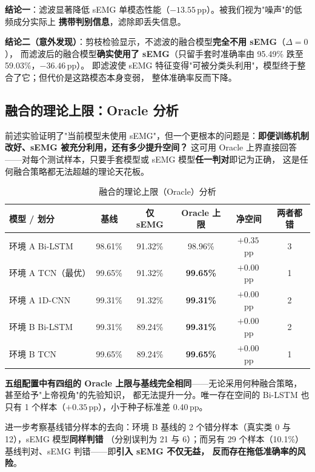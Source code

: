 \documentclass[11pt,a4paper]{ctexart}
\begin{document}
\textbf{结论一}：滤波显著降低 sEMG 单模态性能（$-13.55$\,pp）。被我们视为"噪声"的低频成分实际上
\textbf{携带判别信息}，滤除即丢失信息。

\textbf{结论二（意外发现）}：剪枝检验显示，不滤波的融合模型\textbf{完全不用 sEMG}（$\Delta=0$），
而滤波后的融合模型\textbf{确实使用了 sEMG}（只留手套时准确率由 95.49\% 跌至 59.03\%，$-36.46$\,pp）。
即滤波使 sEMG 特征变得"可被分类头利用"，模型终于整合了它；但代价是这路模态本身变弱，
整体准确率反而下降。

\subsection{融合的理论上限：Oracle 分析}

前述实验证明了"当前模型未使用 sEMG"，但一个更根本的问题是：\textbf{即便训练机制改好、sEMG 被充分利用，还有多少提升空间？}
这可用 Oracle 上界直接回答——对每个测试样本，只要手套模型或 sEMG 模型\textbf{任一判对}即记为正确，
这是任何融合策略都无法超越的理论天花板。

\begin{table}[htbp]\centering
\caption{融合的理论上限（Oracle）分析}
\label{tab:oracle}
\begin{tabular}{lccccc}
\toprule
模型 / 划分 & 基线 & 仅 sEMG & Oracle 上限 & 净空间 & 两者都错 \\
\midrule
环境 A Bi-LSTM & 98.61\% & 91.32\% & 98.96\% & $+0.35$\,pp & 3 \\
环境 A TCN（最优） & 99.65\% & 91.32\% & \textbf{99.65\%} & $\mathbf{+0.00}$\,pp & 1 \\
环境 A 1D-CNN & 99.31\% & 91.32\% & \textbf{99.31\%} & $\mathbf{+0.00}$\,pp & 2 \\
环境 B Bi-LSTM & 99.31\% & 89.24\% & \textbf{99.31\%} & $\mathbf{+0.00}$\,pp & 2 \\
环境 B TCN & 99.65\% & 89.24\% & \textbf{99.65\%} & $\mathbf{+0.00}$\,pp & 1 \\
\bottomrule
\end{tabular}
\end{table}

\textbf{五组配置中有四组的 Oracle 上限与基线完全相同}——无论采用何种融合策略，甚至给予"上帝视角"的先验知识，
都无法提升一分。唯一存在空间的 Bi-LSTM 也只有 1 个样本（$+0.35$\,pp），小于种子标准差 0.40\,pp。

进一步考察基线错分样本的去向：环境 B 基线的 2 个错分样本（真实类 0 与 12），sEMG 模型\textbf{同样判错}
（分别误判为 21 与 6）；而另有 29 个样本（10.1\%）基线判对、sEMG 判错——即\textbf{引入 sEMG 不仅无益，
反而存在拖低准确率的风险}。
\end{document}
